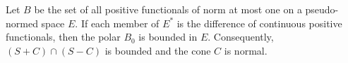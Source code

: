 Let $B$ be the set of all positive functionals of norm at most one on a pseudo-normed space $E$. If each member of $E^*$ is the difference of continuous positive functionals, then the polar $B_0$ is bounded in $E$. Consequently, $(S + C) \cap (S - C)$ is bounded and the cone $C$ is normal.
